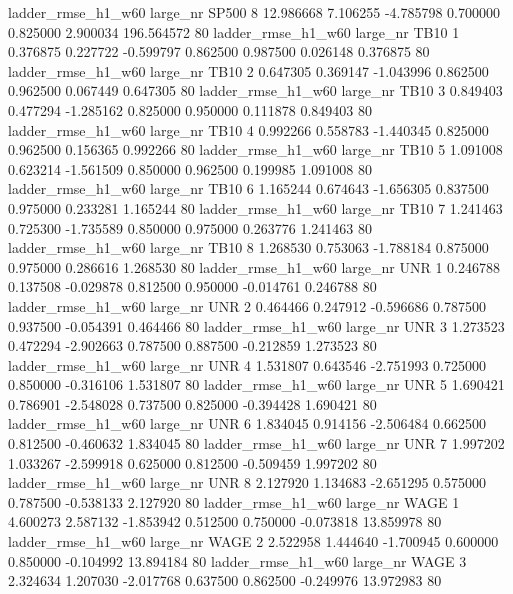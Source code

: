  ladder_rmse_h1_w60   large_nr    SP500                 8 12.986668  7.106255  -4.785798 0.700000 0.825000  2.900034  196.564572 80
 ladder_rmse_h1_w60   large_nr     TB10                 1  0.376875  0.227722  -0.599797 0.862500 0.987500  0.026148    0.376875 80
 ladder_rmse_h1_w60   large_nr     TB10                 2  0.647305  0.369147  -1.043996 0.862500 0.962500  0.067449    0.647305 80
 ladder_rmse_h1_w60   large_nr     TB10                 3  0.849403  0.477294  -1.285162 0.825000 0.950000  0.111878    0.849403 80
 ladder_rmse_h1_w60   large_nr     TB10                 4  0.992266  0.558783  -1.440345 0.825000 0.962500  0.156365    0.992266 80
 ladder_rmse_h1_w60   large_nr     TB10                 5  1.091008  0.623214  -1.561509 0.850000 0.962500  0.199985    1.091008 80
 ladder_rmse_h1_w60   large_nr     TB10                 6  1.165244  0.674643  -1.656305 0.837500 0.975000  0.233281    1.165244 80
 ladder_rmse_h1_w60   large_nr     TB10                 7  1.241463  0.725300  -1.735589 0.850000 0.975000  0.263776    1.241463 80
 ladder_rmse_h1_w60   large_nr     TB10                 8  1.268530  0.753063  -1.788184 0.875000 0.975000  0.286616    1.268530 80
 ladder_rmse_h1_w60   large_nr      UNR                 1  0.246788  0.137508  -0.029878 0.812500 0.950000 -0.014761    0.246788 80
 ladder_rmse_h1_w60   large_nr      UNR                 2  0.464466  0.247912  -0.596686 0.787500 0.937500 -0.054391    0.464466 80
 ladder_rmse_h1_w60   large_nr      UNR                 3  1.273523  0.472294  -2.902663 0.787500 0.887500 -0.212859    1.273523 80
 ladder_rmse_h1_w60   large_nr      UNR                 4  1.531807  0.643546  -2.751993 0.725000 0.850000 -0.316106    1.531807 80
 ladder_rmse_h1_w60   large_nr      UNR                 5  1.690421  0.786901  -2.548028 0.737500 0.825000 -0.394428    1.690421 80
 ladder_rmse_h1_w60   large_nr      UNR                 6  1.834045  0.914156  -2.506484 0.662500 0.812500 -0.460632    1.834045 80
 ladder_rmse_h1_w60   large_nr      UNR                 7  1.997202  1.033267  -2.599918 0.625000 0.812500 -0.509459    1.997202 80
 ladder_rmse_h1_w60   large_nr      UNR                 8  2.127920  1.134683  -2.651295 0.575000 0.787500 -0.538133    2.127920 80
 ladder_rmse_h1_w60   large_nr     WAGE                 1  4.600273  2.587132  -1.853942 0.512500 0.750000 -0.073818   13.859978 80
 ladder_rmse_h1_w60   large_nr     WAGE                 2  2.522958  1.444640  -1.700945 0.600000 0.850000 -0.104992   13.894184 80
 ladder_rmse_h1_w60   large_nr     WAGE                 3  2.324634  1.207030  -2.017768 0.637500 0.862500 -0.249976   13.972983 80
